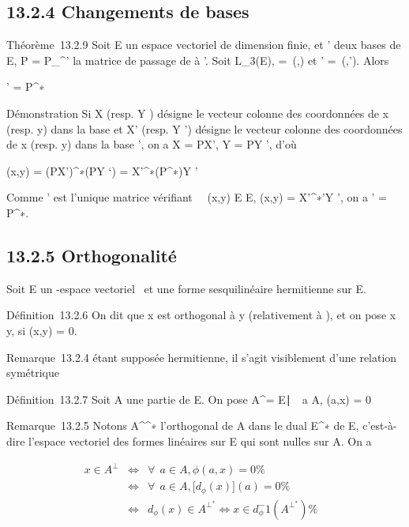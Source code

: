 \documentclass[]{article}
\begin{document}
\subsection{13.2.4 Changements de bases}

Théorème~13.2.9 Soit E un espace vectoriel de dimension finie,  et '
deux bases de E, P = P_^' la matrice de passage de  à
'. Soit \phi \in L_3(E), \Omega =\
\mathrmMat (\phi,) et \Omega' =\
\mathrmMat (\phi,'). Alors

\Omega' = P^∗\OmegaP

Démonstration Si X (resp. Y ) désigne le vecteur colonne des coordonnées
de x (resp. y) dans la base  et X' (resp. Y ') désigne le vecteur
colonne des coordonnées de x (resp. y) dans la base \mathcal{E}', on a X = PX', Y
= PY ', d'où

\phi(x,y) = (PX')^∗\Omega(PY `) = X'^∗(P^∗\OmegaP)Y
'

Comme \Omega' est l'unique matrice vérifiant \forall~~(x,y)
\in E \times E, \phi(x,y) = X'^∗\Omega'Y ', on a \Omega' = P^∗\OmegaP.

\subsection{13.2.5 Orthogonalité}

Soit E un -espace vectoriel ~et \phi une forme sesquilinéaire hermitienne
sur E.

Définition~13.2.6 On dit que x est orthogonal à y (relativement à \phi), et
on pose x \bot y, si \phi(x,y) = 0.

Remarque~13.2.4 \phi étant supposée hermitienne, il s'agit visiblement
d'une relation symétrique

Définition~13.2.7 Soit A une partie de E. On pose A^\bot =
\x \in
E∣\forall~~a \in A, \phi(a,x) =
0\

Remarque~13.2.5 Notons A^\bot^∗  l'orthogonal de A
dans le dual E^∗ de E, c'est-à-dire l'espace vectoriel des
formes linéaires sur E qui sont nulles sur A. On a

\begin{align*} x \in A^\bot&
\Leftrightarrow & \forall~~a \in A, \phi(a,x)
= 0 \%& \\ &
\Leftrightarrow & \forall~~a \in A,
\big [d_\phi(x)\big ](a) = 0
\%& \\ & \Leftrightarrow &
d_\phi(x) \in A^\bot^∗ 
\Leftrightarrow x \in
d_\phi^-1(A^\bot^∗ )\%&
\\ \end{align*}
\end{document}
